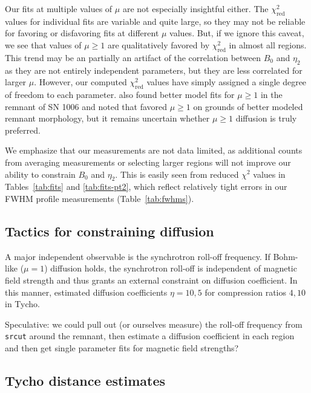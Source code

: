 \documentclass[iop, apj, numberedappendix]{emulateapj}
\newcommand*{\mt}{\mathrm}
\begin{document}
Our fits at multiple values of $\mu$ are not especially insightful either.
The $\chi^2_{\mt{red}}$ values for individual fits are variable and quite
large, so they may not be reliable for favoring or disfavoring fits at
different $\mu$ values.  But, if we ignore this caveat, we see that values
of $\mu \geq 1$ are qualitatively favored by $\chi^2_{\mt{red}}$ in almost all
regions.  This trend may be an partially an artifact of the correlation between
$B_0$ and $\eta_2$ as they are not entirely independent parameters, but they
are less correlated for larger $\mu$.  However, our computed
$\chi^2_{\mt{red}}$ values have simply assigned a single degree of freedom to
each parameter.   also found better model fits for $\mu
\geq 1$ in the remnant of SN 1006 and noted that \citet{reynolds2004} favored
$\mu \geq 1$ on grounds of better modeled remnant morphology, but it remains
uncertain whether $\mu \geq 1$ diffusion is truly preferred.

We emphasize that our measurements are not data limited, as additional counts
from averaging measurements or selecting larger regions will not improve our
ability to constrain $B_0$ and $\eta_2$.  This is easily seen from reduced
$\chi^2$ values in Tables~\ref{tab:fits} and \ref{tab:fits-pt2}, which
reflect relatively tight errors in our FWHM profile measurements
(Table~\ref{tab:fwhms}).


\subsection{Tactics for constraining diffusion}

A major independent observable is the synchrotron roll-off frequency.  If
Bohm-like ($\mu = 1$) diffusion holds, the synchrotron roll-off is
independent of magnetic field strength and thus grants an external
constraint on diffusion coefficient.
In this manner, \citet{parizot2006} estimated diffusion coefficients
$\eta = 10, 5$ for compression ratios $4, 10$ in Tycho.

Speculative: we could pull out (or ourselves measure) the roll-off frequency
from \texttt{srcut} around the remnant, then estimate a diffusion coefficient
in each region and then get single parameter fits for magnetic field strengths?

\subsection{Tycho distance estimates}
\end{document}
